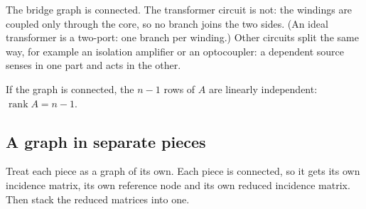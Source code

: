 \documentclass[11pt,a4paper]{article}
\begin{document}
The bridge graph is connected. The transformer circuit is not: the windings are
coupled only through the core, so no branch joins the two sides. (An ideal transformer is a
two-port: one branch per winding.) Other circuits split the same way, for example an
isolation amplifier or an optocoupler: a dependent source senses in one part and acts in the
other.

\begin{ideabox}
If the graph is connected, the $n-1$ rows of $A$ are linearly independent:
$\operatorname{rank} A = n - 1$.
\end{ideabox}

\subsection{A graph in separate pieces}\label{sec:pieces}

Treat each piece as a graph of its own. Each piece is connected, so it gets its own
incidence matrix, its own reference node and its own reduced incidence matrix. Then stack
the reduced matrices into one.
\end{document}
